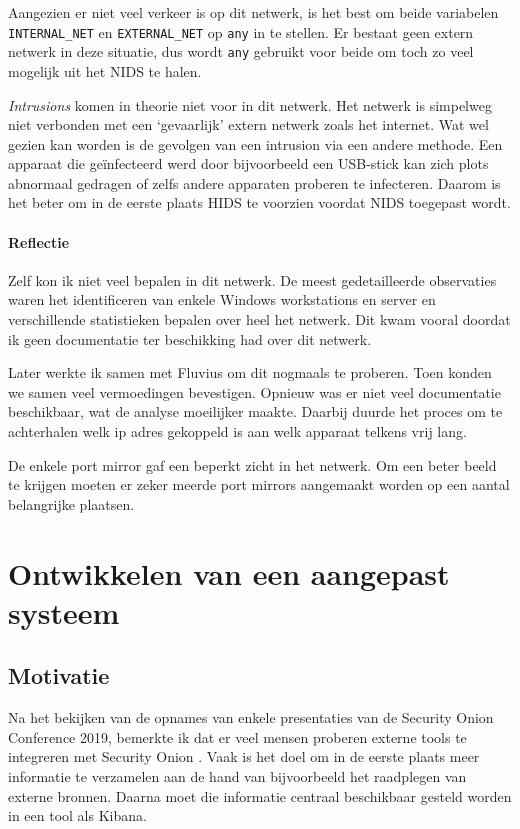 \documentclass[a4paper, 12pt]{report}
\begin{document}
Aangezien er niet veel verkeer is op dit netwerk, is het best om beide variabelen \lstinline|INTERNAL_NET| en \lstinline|EXTERNAL_NET| op \lstinline|any| in te stellen.
Er bestaat geen extern netwerk in deze situatie, dus wordt \lstinline|any| gebruikt voor beide om toch zo veel mogelijk uit het NIDS te halen.

\emph{Intrusions} komen in theorie niet voor in dit netwerk.
Het netwerk is simpelweg niet verbonden met een `gevaarlijk' extern netwerk zoals het internet.
Wat wel gezien kan worden is de gevolgen van een intrusion via een andere methode.
Een apparaat die geïnfecteerd werd door bijvoorbeeld een USB-stick kan zich plots abnormaal gedragen of zelfs andere apparaten proberen te infecteren.
Daarom is het beter om in de eerste plaats HIDS te voorzien voordat NIDS toegepast wordt.


\subsubsection{Reflectie}
Zelf kon ik niet veel bepalen in dit netwerk.
De meest gedetailleerde observaties waren het identificeren van enkele Windows workstations en server en verschillende statistieken bepalen over heel het netwerk.
Dit kwam vooral doordat ik geen documentatie ter beschikking had over dit netwerk.

Later werkte ik samen met Fluvius om dit nogmaals te proberen.
Toen konden we samen veel vermoedingen bevestigen.
Opnieuw was er niet veel documentatie beschikbaar, wat de analyse moeilijker maakte.
Daarbij duurde het proces om te achterhalen welk ip adres gekoppeld is aan welk apparaat telkens vrij lang.

De enkele port mirror gaf een beperkt zicht in het netwerk.
Om een beter beeld te krijgen moeten er zeker meerde port mirrors aangemaakt worden op een aantal belangrijke plaatsen.

\chapter{Ontwikkelen van een aangepast systeem}
\label{sec:aangepast-systeem}
\section{Motivatie}
Na het bekijken van de opnames van enkele presentaties van de Security Onion Conference 2019, bemerkte ik dat er veel mensen proberen externe tools te integreren met Security Onion \autocite{so:conference-2019}.
Vaak is het doel om in de eerste plaats meer informatie te verzamelen aan de hand van bijvoorbeeld het raadplegen van externe bronnen.
Daarna moet die informatie centraal beschikbaar gesteld worden in een tool als Kibana.
\end{document}
